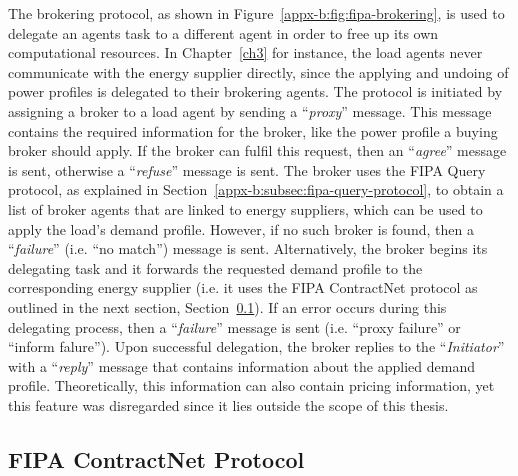 

The brokering protocol, as shown in Figure~\ref{appx-b:fig:fipa-brokering}, is used to delegate an agents task to a different agent in order to free up its own computational resources.
In Chapter~\ref{ch3} for instance, the load agents never communicate with the energy supplier directly, since the applying and undoing of power profiles is delegated to their brokering agents.
The protocol is initiated by assigning a broker to a load agent by sending a ``\textit{proxy}'' message.
This message contains the required information for the broker, like the power profile a buying broker should apply.
If the broker can fulfil this request, then an ``\textit{agree}'' message is sent, otherwise a ``\textit{refuse}'' message is sent.
The broker uses the FIPA Query protocol, as explained in Section~\ref{appx-b:subsec:fipa-query-protocol}, to obtain a list of broker agents that are linked to energy suppliers, which can be used to apply the load's demand profile.
However, if no such broker is found, then a ``\textit{failure}'' (i.e. ``no match'') message is sent.
Alternatively, the broker begins its delegating task and it forwards the requested demand profile to the corresponding energy supplier (i.e. it uses the FIPA ContractNet protocol as outlined in the next section, Section~\ref{appx-b:subsec:fipa-contract-net-protocol}).
If an error occurs during this delegating process, then a ``\textit{failure}'' message is sent (i.e. ``proxy failure'' or ``inform falure'').
Upon successful delegation, the broker replies to the ``\textit{Initiator}'' with a ``\textit{reply}'' message that contains information about the applied demand profile.
Theoretically, this information can also contain pricing information, yet this feature was disregarded since it lies outside the scope of this thesis.

\subsection{FIPA ContractNet Protocol}
\label{appx-b:subsec:fipa-contract-net-protocol}



